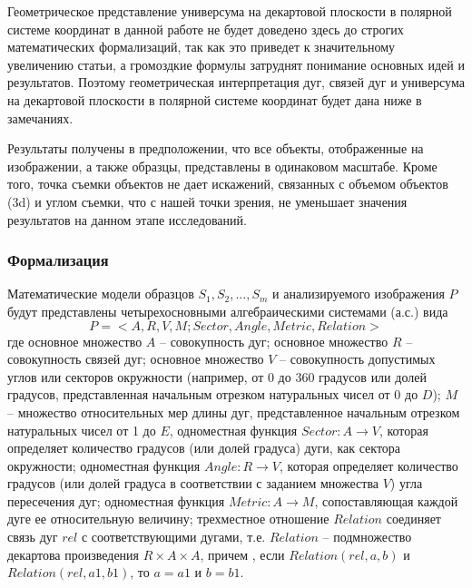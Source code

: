 Геометрическое представление универсума на декартовой плоскости в полярной системе координат в данной работе не будет доведено здесь до строгих математических формализаций, так как это приведет к значительному увеличению статьи, а громоздкие формулы затруднят понимание основных идей и результатов. Поэтому геометрическая интерпретация дуг, связей дуг и универсума на декартовой плоскости в полярной системе координат будет дана ниже в замечаниях.

Результаты получены в предположении, что все объекты, отображенные  на изображении, а также образцы, представлены в одинаковом масштабе. Кроме того, точка съемки объектов не дает искажений, связанных с объемом объектов (3d) и углом съемки, что с нашей точки зрения, не уменьшает значения результатов на данном этапе исследований.

\subsubsection{Формализация}

Математические модели образцов $S_1, S_2, ..., S_m$  и анализируемого изображения $P$ будут представлены четырехосновными алгебраическими системами (а.с.) \cite{D10,D6} вида
\begin{equation}
P = < A, R, V, M; Sector,  Angle, Metric, Relation >
\label{overlaps:1}
\end{equation}
где  основное множество $A$ -- совокупность дуг; основное множество $R$ -- совокупность связей дуг; основное множество $V$ -- совокупность допустимых углов или  секторов окружности  (например, от 0 до 360 градусов или долей градусов, представленная  начальным  отрезком  натуральных чисел от 0 до $D$); $M$ -- множество относительных мер длины дуг, представленное  начальным отрезком натуральных чисел от 1 до $E$, одноместная функция $Sector: A \to V$, которая определяет количество градусов (или долей градуса) дуги,  как сектора окружности; одноместная функция  $Angle: R \to V$, которая  определяет количество градусов (или  долей градуса в соответствии с заданием множества $V$) угла пересечения дуг; одноместная функция  $Metric : A \to M$, сопоставляющая каждой дуге ее относительную величину; трехместное отношение $Relation$ соединяет связь дуг $rel$ с соответствующими дугами, т.е. $Relation$ -- подмножество декартова произведения  $R \times A \times A$, причем , если $Relation(rel , a, b)$  и $Relation(rel , a1, b1)$,  то $a = a1$  и  $b = b1$.

